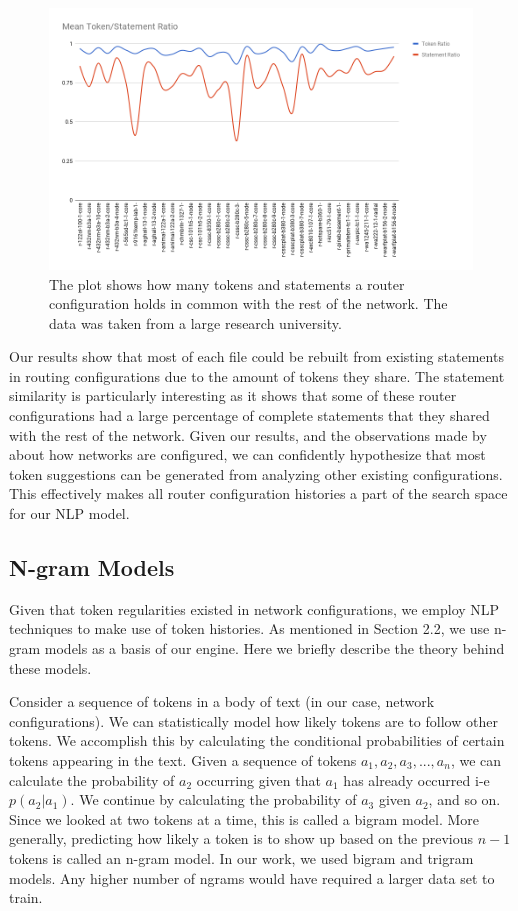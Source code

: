 \begin{figure}[H]
	\centering
	\includegraphics[width=\textwidth]{chart.png}
	\caption{The plot shows how many tokens and statements a router configuration holds in common with the rest of the network. The data was taken from a large research university.}
\end{figure}

Our results show that most of each file could be rebuilt from existing statements in routing configurations due to the amount of tokens they share. The statement similarity is particularly interesting as it shows that some of these router configurations had a large percentage of complete statements that they shared with the rest of the network. Given our results, and the observations made by~\cite{complexity} about how networks are configured, we can confidently hypothesize that most token suggestions can be generated from analyzing other existing configurations. This effectively makes all router configuration histories a part of the search space for our NLP model. 

\subsection{N-gram Models}

Given that token regularities existed in network configurations, we employ NLP techniques to make use of token histories. As mentioned in Section 2.2, we use n-gram models as a basis of our engine. Here we briefly describe the theory behind these models. 

Consider a sequence of tokens in a body of text (in our case, network configurations). We can statistically model how likely tokens are to follow other tokens. We accomplish this by calculating the conditional probabilities of certain tokens appearing in the text. Given a sequence of tokens $a_1,a_2,a_3,...,a_n$, we can calculate the probability of $a_2$ occurring given that $a_1$ has already occurred i-e $p(a_2 | a_1)$. We continue by calculating the probability of $a_3$ given $a_2$, and so on. Since we looked at two tokens at a time, this is called a bigram model. More generally, predicting how likely a token is to show up based on the previous $n-1$ tokens is called an n-gram model. In our work, we used bigram and trigram models. Any higher number of ngrams would have required a larger data set to train.\\

